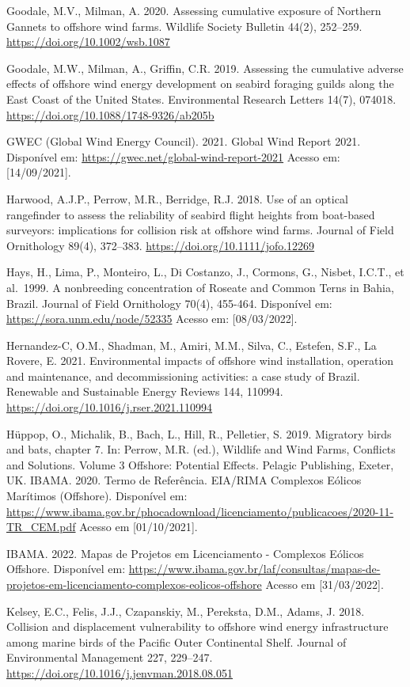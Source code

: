 \documentclass[
  oneside]{scrbook}
\begin{document}
Goodale, M.V., Milman, A. 2020. Assessing cumulative exposure of Northern Gannets to offshore wind farms. Wildlife Society Bulletin 44(2), 252--259. \url{https://doi.org/10.1002/wsb.1087}

Goodale, M.W., Milman, A., Griffin, C.R. 2019. Assessing the cumulative adverse effects of offshore wind energy development on seabird foraging guilds along the East Coast of the United States. Environmental Research Letters 14(7), 074018. \url{https://doi.org/10.1088/1748-9326/ab205b}

GWEC (Global Wind Energy Council). 2021. Global Wind Report 2021. Disponível em: \url{https://gwec.net/global-wind-report-2021} Acesso em: {[}14/09/2021{]}.

Harwood, A.J.P., Perrow, M.R., Berridge, R.J. 2018. Use of an optical rangefinder to assess the reliability of seabird flight heights from boat-based surveyors: implications for collision risk at offshore wind farms. Journal of Field Ornithology 89(4), 372--383. \url{https://doi.org/10.1111/jofo.12269}

Hays, H., Lima, P., Monteiro, L., Di Costanzo, J., Cormons, G., Nisbet, I.C.T., et al.~1999. A nonbreeding concentration of Roseate and Common Terns in Bahia, Brazil. Journal of Field Ornithology 70(4), 455-464. Disponível em: \url{https://sora.unm.edu/node/52335} Acesso em: {[}08/03/2022{]}.

Hernandez-C, O.M., Shadman, M., Amiri, M.M., Silva, C., Estefen, S.F., La Rovere, E. 2021. Environmental impacts of offshore wind installation, operation and maintenance, and decommissioning activities: a case study of Brazil. Renewable and Sustainable Energy Reviews 144, 110994. \url{https://doi.org/10.1016/j.rser.2021.110994}

Hüppop, O., Michalik, B., Bach, L., Hill, R., Pelletier, S. 2019. Migratory birds and bats, chapter 7. In: Perrow, M.R. (ed.), Wildlife and Wind Farms, Conflicts and Solutions. Volume 3 Offshore: Potential Effects. Pelagic Publishing, Exeter, UK.
IBAMA. 2020. Termo de Referência. EIA/RIMA Complexos Eólicos Marítimos (Offshore). Disponível em: \url{https://www.ibama.gov.br/phocadownload/licenciamento/publicacoes/2020-11-TR_CEM.pdf} Acesso em {[}01/10/2021{]}.

IBAMA. 2022. Mapas de Projetos em Licenciamento - Complexos Eólicos Offshore. Disponível em: \url{https://www.ibama.gov.br/laf/consultas/mapas-de-projetos-em-licenciamento-complexos-eolicos-offshore} Acesso em {[}31/03/2022{]}.

Kelsey, E.C., Felis, J.J., Czapanskiy, M., Pereksta, D.M., Adams, J. 2018. Collision and displacement vulnerability to offshore wind energy infrastructure among marine birds of the Pacific Outer Continental Shelf. Journal of Environmental Management 227, 229--247. \url{https://doi.org/10.1016/j.jenvman.2018.08.051}
\end{document}
